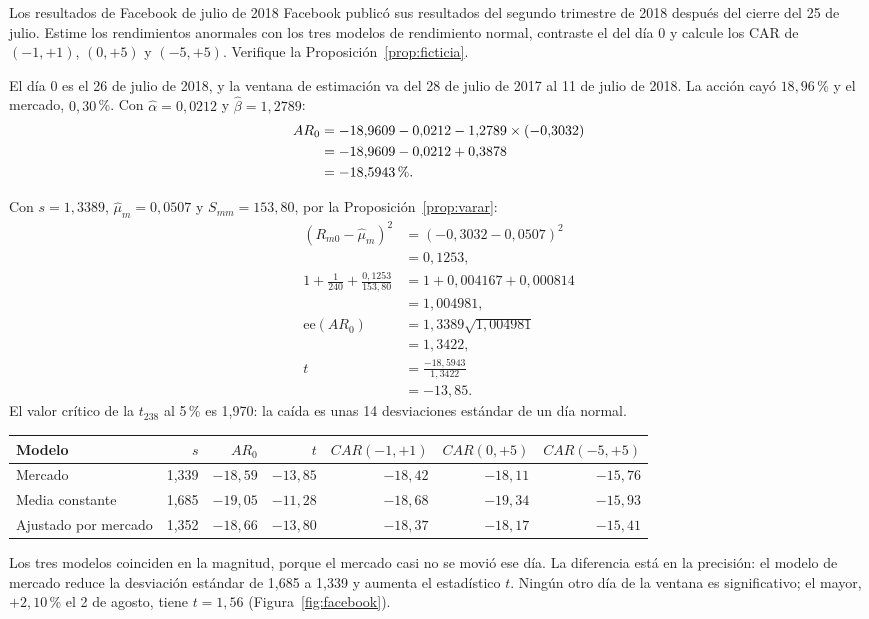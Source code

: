 \begin{ejresuelto}{Los resultados de Facebook de julio de 2018}\label{ej:facebook}
\enunciado Facebook publicó sus resultados del segundo trimestre de 2018 después del cierre del 25 de julio. Estime los
rendimientos anormales con los tres modelos de rendimiento normal, contraste el del día 0 y calcule los CAR de
$(-1,+1)$, $(0,+5)$ y $(-5,+5)$. Verifique la Proposición~\ref{prop:ficticia}.

\solucion
{} El día 0 es el 26 de julio de 2018, y la ventana de estimación va del 28 de
julio de 2017 al 11 de julio de 2018. La acción cayó $18{,}96$\,\% y el mercado, $0{,}30$\,\%. Con $\hat\alpha=0{,}0212$ y
$\hat\beta=1{,}2789$:
\begin{align*}
  AR_0 &= -18{,}9609-0{,}0212-1{,}2789\times(-0{,}3032)\\
       &= -18{,}9609-0{,}0212+0{,}3878\\
       &= -18{,}5943\text{\,\%}.
\end{align*}

 Con $s=1{,}3389$, $\hat\mu_m=0{,}0507$ y $S_{mm}=153{,}80$, por la
Proposición~\ref{prop:varar}:
\begin{align*}
  (R_{m0}-\hat\mu_m)^2 &= (-0{,}3032-0{,}0507)^2\\
                      &= 0{,}1253,\\
  1+\tfrac1{240}+\tfrac{0{,}1253}{153{,}80} &= 1+0{,}004167+0{,}000814\\
                                         &= 1{,}004981,\\
  \text{ee}(AR_0) &= 1{,}3389\sqrt{1{,}004981}\\
                  &= 1{,}3422,\\
  t &= \frac{-18{,}5943}{1{,}3422}\\
    &= -13{,}85 .
\end{align*}
El valor crítico de la $t_{238}$ al 5\,\% es 1,970: la caída es unas 14 desviaciones estándar de un día normal.

\begin{center}\small
\begin{tabular}{@{}lrrrrrr@{}}
\toprule
Modelo & $s$ & $AR_0$ & $t$ & $CAR(-1,+1)$ & $CAR(0,+5)$ & $CAR(-5,+5)$ \\
\midrule
Mercado & 1,339 & $-18{,}59$ & $-13{,}85$ & $-18{,}42$ & $-18{,}11$ & $-15{,}76$ \\
Media constante & 1,685 & $-19{,}05$ & $-11{,}28$ & $-18{,}68$ & $-19{,}34$ & $-15{,}93$ \\
Ajustado por mercado & 1,352 & $-18{,}66$ & $-13{,}80$ & $-18{,}37$ & $-18{,}17$ & $-15{,}41$ \\
\bottomrule
\end{tabular}
\end{center}
Los tres modelos coinciden en la magnitud, porque el mercado casi no se movió ese día. La diferencia está en la
precisión: el modelo de mercado reduce la desviación estándar de 1,685 a 1,339 y aumenta el estadístico $t$. Ningún otro día
de la ventana es significativo; el mayor, $+2{,}10$\,\% el 2 de agosto, tiene $t=1{,}56$ (Figura~\ref{fig:facebook}).


\end{ejresuelto}
